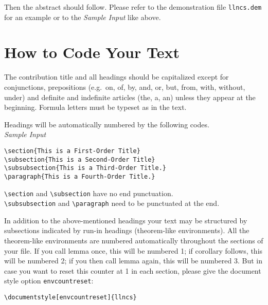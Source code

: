 Then the abstract should follow. Please refer to the
demonstration file {\tt llncs.dem} for an example or
to the {\it Sample Input\/} like above.
%
\section{How to Code Your Text}
%
The contribution title and all headings should be capitalized
except for conjunctions, prepositions
(e.g.\ on, of, by, and, or, but,  from, with, without, under)
and definite and indefinite articles (the, a, an) unless they appear at
the beginning. Formula letters must be typeset as in the text.

Headings will be automatically numbered by the following codes.\\[2mm]
{\it Sample Input}
\begin{verbatim}
\section{This is a First-Order Title}
\subsection{This is a Second-Order Title}
\subsubsection{This is a Third-Order Title.}
\paragraph{This is a Fourth-Order Title.}
\end{verbatim}
\verb|\section| and \verb|\subsection| have no end punctuation.\\
\verb|\subsubsection| and  \verb|\paragraph|
need to be punctuated at the end.

In addition to the above-mentioned headings your text may be structured
by subsections indicated by run-in headings (theorem-like environments).
All the theorem-like environments are numbered automatically
throughout the sections of your file.
If you call lemma once, this will be numbered 1; if corollary follows,
this will be numbered 2; if you then call lemma again, this will be
numbered 3.
\newpage
But in case you want to reset this counter at 1 in each section,
please give the  document style option \verb|envcountreset|:
\begin{verbatim}
\documentstyle[envcountreset]{llncs}
\end{verbatim}


